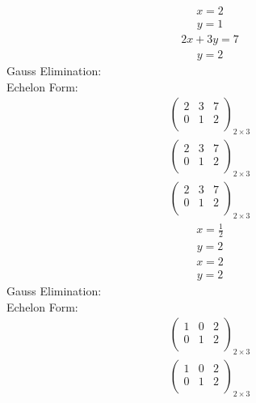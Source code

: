 \documentclass{article}
\begin{document}
\begin{align*}
x=2\end{align*}
\begin{align*}
y=1\end{align*}
\begin{align*}
2x + 3y=7\end{align*}
\begin{align*}
y=2\end{align*}
Gauss Elimination:\\
Echelon Form:\\
\begin{align*}
\left(
\begin{array}{cc|c}
2 & 3 & 7\\
0 & 1 & 2\\
\end{array}
\right)_{2\times 3}
\end{align*}
\begin{align*}
\left(
\begin{array}{cc|c}
2 & 3 & 7\\
0 & 1 & 2\\
\end{array}
\right)_{2\times 3}
\end{align*}
\begin{align*}
\left(
\begin{array}{cc|c}
2 & 3 & 7\\
0 & 1 & 2\\
\end{array}
\right)_{2\times 3}
\end{align*}
\begin{align*}
x=\frac{1}{2}\end{align*}
\begin{align*}
y=2\end{align*}
\begin{align*}
x=2\end{align*}
\begin{align*}
y=2\end{align*}
Gauss Elimination:\\
Echelon Form:\\
\begin{align*}
\left(
\begin{array}{cc|c}
1 & 0 & 2\\
0 & 1 & 2\\
\end{array}
\right)_{2\times 3}
\end{align*}
\begin{align*}
\left(
\begin{array}{cc|c}
1 & 0 & 2\\
0 & 1 & 2\\
\end{array}
\right)_{2\times 3}
\end{align*}
\end{document}
